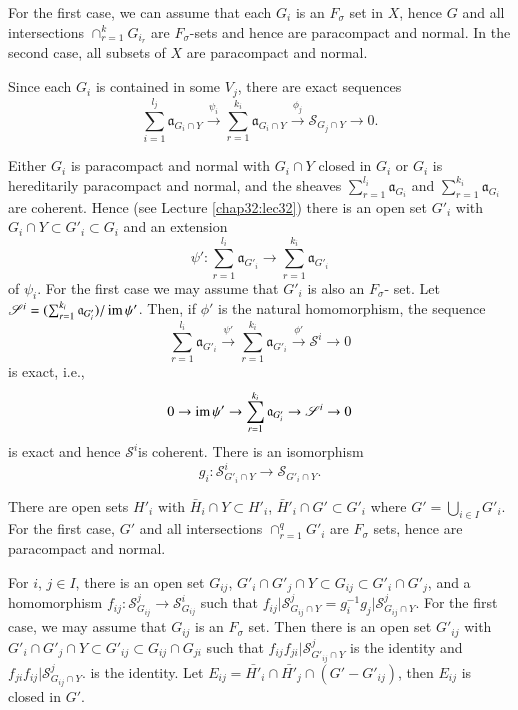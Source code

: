 For the first case, we can assume that each $G_i$ is an $F_{\sigma}$
set in $X$, hence $G$ and all intersections $\cap^{k}_{r=1} G_{i_r}$
are $F_{\sigma}$-sets and hence are paracompact and normal. In the
second case, all subsets of $X$ are paracompact and normal. 

Since each $G_i$ is contained in some $V_j$, there are exact sequences  
$$
\sum^{l_j}_{i=1} \mathfrak{a}_{G_i \cap Y} \xrightarrow{\psi_i}
\sum^{k_i}_{r=1} \mathfrak{a}_{G_i \cap Y} \xrightarrow{\phi_j}
\mathscr{S}_{G_j   \cap Y} \to 0. 
$$

Either $G_i$ is paracompact and normal with $G_i \cap Y$ closed in
$G_i$ or $G_i$ is hereditarily paracompact and normal, and the sheaves
$\sum^{l_i}_{r=1} \mathfrak{a}_{G_i}$ and  $\sum^{k_i}_{r=1}
\mathfrak{a}_{G_i}$ are coherent. Hence (see Lecture
\ref{chap32:lec32}) there is an 
open set $G'_i$ with $G_i \cap Y \subset G'_i \subset G_i$ and an
extension   
$$
\psi' : \sum^{l_i}_{r=1} \mathfrak{a}_{G'_i} \to \sum^{k_i}_{r=1}
\mathfrak{a}_{G'_i}   
$$
of $\psi_i$. For the first case we may assume that $G'_i$ is also an 
$F_{\sigma}$- set. Let $\mathscr{S}^i = (\sum^{k_i}_{r=1}
\mathfrak{a}_{G'_i})/ \operatorname{im} \psi'$. Then, if $\phi'$ is the natural
homomorphism, the sequence    
$$
\sum^{l_i}_{r=1} \mathfrak{a}_{G'_i} \xrightarrow{\psi'} \sum^{k_i}_{r=1}
\mathfrak{a}_{G'_i} \xrightarrow{\phi'} \mathscr{S}^i \to 0 
$$\pageoriginale
is exact, i.e., 
$$
0 \to \operatorname{im} \psi' \to \sum^{k_i}_{r=1} \mathfrak{a}_{G'_i} \to 
\mathscr{S}^i \to 0 
$$
is exact and hence $\mathscr{S}^i$is coherent. There is an isomorphism  
$$
g_i : \mathscr{S}^i_{G'_i \cap Y} \to \mathscr{S}_{G'_i \cap Y}. 
$$

There are open sets $H'_i$ with $\bar{H}_i \cap Y \subset H'_i$,
$\bar{H}'_i \cap G' \subset G'_i$ where $G' = \bigcup \limits_{i \in
  I}G'_i$. For the first case, $G'$ and all intersections
$\cap^q_{r=1}G'_i$ are $F_{\sigma}$ sets, hence are paracompact and
normal. 

For $i$, $j \in I$, there is an open set $G_{ij}$, $G'_i \cap G'_j \cap Y
\subset G_{ij} \subset G'_i \cap G'_j$, and a homomorphism $f_{ij}:
\mathscr{S}^j_{G_{ij}} \to \mathscr{S}^i_{G_{ij}}$ such that $f_{ij} \Big|
\mathscr{S}^j_{G_{ij} \cap Y} = g^{-1}_i g_j \Big| \mathscr{S}^j_{G_{ij}
  \cap Y}$. For the first case, we may assume that $G_{ij}$ is an
$F_{\sigma}$ set. Then there is an open set $G'_{ij}$ with $G'_i \cap
G'_j \cap Y \subset G'_{ij} \subset G_{ij} \cap G_{ji}$ such that $f_{ij}
f_{ji} \Big|\mathscr{S}^j_{G'_{ij} \cap Y}$ is the identity and $f_{ji}
f_{ij} \Big|\mathscr{S}^j_{G_{ij} \cap Y}$. is the identity. Let $E_{ij} =
\bar{H'}_i \cap \bar{H'}_j \cap (G' - G'_{ij})$, then $E_{ij}$ is
closed in $G'$. 

